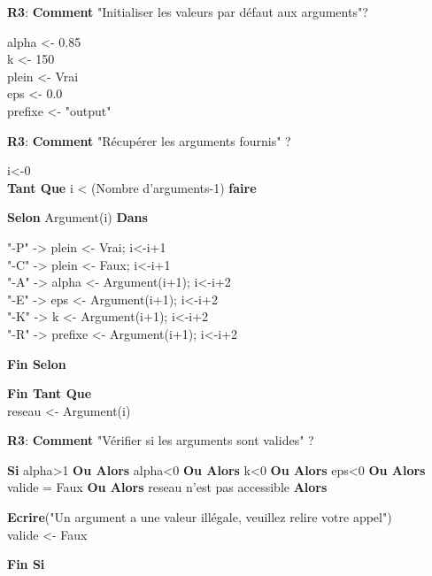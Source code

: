 \documentclass{NewTeXRaffinage}
\begin{document}
\textbf{R3}: \textbf{Comment} "Initialiser les valeurs par défaut aux arguments"?
\begin{addmargin}[5em]{0pt}
    alpha <- 0.85 \\
    k <- 150 \\
    plein <- Vrai \\
    eps <- 0.0 \\
    prefixe <- "output"
\end{addmargin}

\textbf{R3}: \textbf{Comment} "Récupérer les arguments fournis" ?
\begin{addmargin}[5em]{0pt}
    i<-0 \\
    \textbf{Tant Que} i < (Nombre d'arguments-1) \textbf{faire}
        \begin{addmargin}[3em]{0pt}
            \textbf{Selon} Argument(i) \textbf{Dans}
            \begin{addmargin}[3em]{0pt}
                "-P" -> plein <- Vrai; i<-i+1 \\
                "-C" -> plein <- Faux; i<-i+1 \\
                "-A" -> alpha <- Argument(i+1); i<-i+2 \\
                "-E" -> eps <- Argument(i+1); i<-i+2 \\
                "-K" -> k <- Argument(i+1); i<-i+2 \\
                "-R" -> prefixe <- Argument(i+1); i<-i+2
            \end{addmargin}
            \textbf{Fin Selon}
        \end{addmargin}
    \textbf{Fin Tant Que} \\
    reseau <- Argument(i)
\end{addmargin}

\textbf{R3}: \textbf{Comment} "Vérifier si les arguments sont valides" ?
\begin{addmargin}[5em]{0pt}
    \textbf{Si} alpha>1\textbf{ Ou Alors} alpha<0 \textbf{Ou Alors} k<0 \textbf{Ou Alors} eps<0 \textbf{Ou Alors} valide = Faux \textbf{Ou Alors} reseau n'est pas accessible \textbf{Alors}
        \begin{addmargin}[3em]{0pt}
            \textbf{Ecrire}("Un argument a une valeur illégale, veuillez relire votre appel") \\
            valide <- Faux
        \end{addmargin}
    \textbf{Fin Si}
\end{addmargin}
\end{document}
